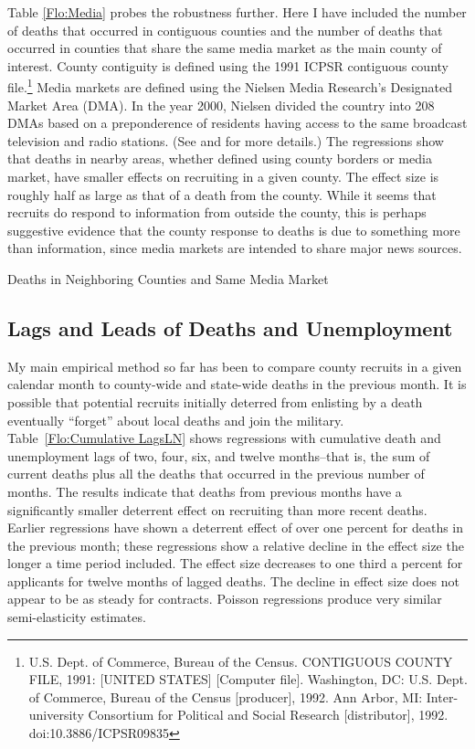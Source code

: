 \documentclass[12pt] {article}
\begin{document}
Table \ref{Flo:Media} probes the robustness further. Here I have included the number of deaths that occurred in contiguous counties and the number of deaths that occurred in counties that share
the same media market as the main county of interest. County contiguity
is defined using the 1991 ICPSR contiguous county file.\footnote{U.S. Dept. of Commerce, Bureau of the Census. CONTIGUOUS COUNTY FILE,
1991: {[}UNITED STATES{]} {[}Computer file{]}. Washington, DC: U.S.
Dept. of Commerce, Bureau of the Census {[}producer{]}, 1992. Ann
Arbor, MI: Inter- university Consortium for Political and Social Research
{[}distributor{]}, 1992. doi:10.3886/ICPSR09835 
} Media markets are defined using the Nielsen Media Research's Designated
Market Area (DMA). In the year 2000, Nielsen divided the country into 208 DMAs based on a preponderence of residents having access to the same broadcast television and radio stations.   (See \cite{DMAsource1} and \cite{DMAsource2} for more details.) The regressions show that deaths in nearby areas, whether defined using county borders or media market, have smaller effects on recruiting in a given county. The effect size is roughly half as large as that of a death from the county. While it seems that recruits do respond to information from outside the county, this is perhaps suggestive evidence that the county response to deaths is due to something more than information, since media markets are intended to share major news sources. 

\begin{table}
\caption{Deaths in Neighboring Counties and Same Media Market}
\label{Flo:Media}
\scalebox{0.65}{
}
\end{table}

\subsection{Lags and Leads of Deaths and Unemployment\label{sub:Lags}}
My main empirical method so far has been to compare county recruits
in a given calendar month to county-wide and state-wide deaths in
the previous month. It is possible that potential recruits initially
deterred from enlisting by a death eventually {}``forget'' about
local deaths and join the military. Table~\ref{Flo:Cumulative LagsLN}
shows regressions with cumulative death and unemployment lags
of two, four, six, and twelve months--that is, the sum of current
deaths plus all the deaths that occurred in the previous number of
months. The results indicate that deaths from previous months have a significantly smaller deterrent effect on recruiting than more recent deaths. Earlier regressions have shown a deterrent effect of over one percent for deaths in the previous month; these
regressions show a relative decline in the effect size the longer a time period included. The effect size decreases to one third a percent for applicants for twelve months of lagged deaths. The decline in effect size does not appear to be as steady for contracts. Poisson regressions produce very similar semi-elasticity
estimates.
\end{document}
